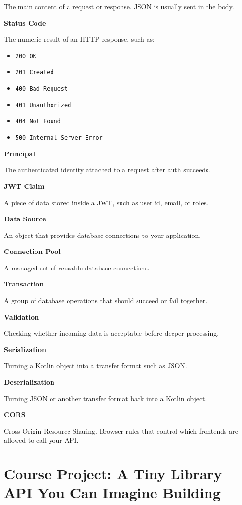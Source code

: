 \documentclass[11pt,a4paper]{article}
\begin{document}
The main content of a request or response. JSON is usually sent in the body.

\textbf{Status Code}

The numeric result of an HTTP response, such as:
\begin{itemize}
    \item \texttt{200 OK}
    \item \texttt{201 Created}
    \item \texttt{400 Bad Request}
    \item \texttt{401 Unauthorized}
    \item \texttt{404 Not Found}
    \item \texttt{500 Internal Server Error}
\end{itemize}

\textbf{Principal}

The authenticated identity attached to a request after auth succeeds.

\textbf{JWT Claim}

A piece of data stored inside a JWT, such as user id, email, or roles.

\textbf{Data Source}

An object that provides database connections to your application.

\textbf{Connection Pool}

A managed set of reusable database connections.

\textbf{Transaction}

A group of database operations that should succeed or fail together.

\textbf{Validation}

Checking whether incoming data is acceptable before deeper processing.

\textbf{Serialization}

Turning a Kotlin object into a transfer format such as JSON.

\textbf{Deserialization}

Turning JSON or another transfer format back into a Kotlin object.

\textbf{CORS}

Cross-Origin Resource Sharing. Browser rules that control which frontends are allowed to call your API.

\section{Course Project: A Tiny Library API You Can Imagine Building}
\end{document}
